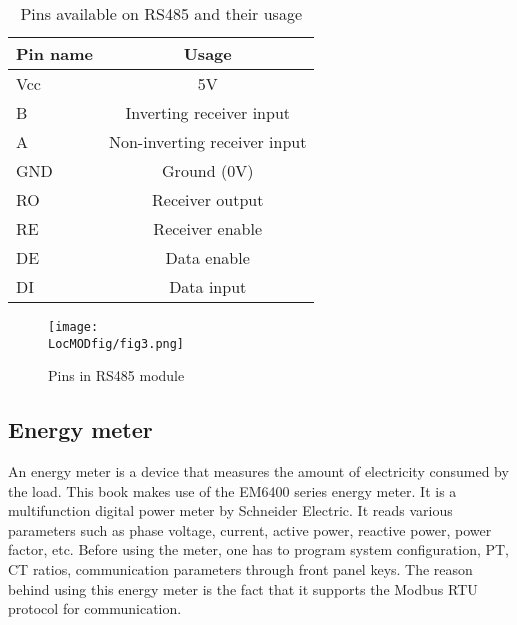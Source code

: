 \begin{table}
  \centering
  \caption{Pins available on RS485 and their usage}
  \label{tab:rs-485-pins}
  \begin{tabular}{lc}\hline
    Pin name & Usage                        \\ \hline 
    Vcc      & 5V                           \\ 
    B        & Inverting receiver input     \\ 
    A        & Non-inverting receiver input \\
    GND      & Ground (0V)                  \\ 
    RO       & Receiver output              \\ 
    RE       & Receiver enable              \\
    DE       & Data enable                  \\
    DI       & Data input                   \\ 
    \hline
  \end{tabular}
\end{table}





\begin{figure}
  \centering
  \texttt{[image: \\LocMODfig/fig3.png]}
  \caption{Pins in RS485 module}
  \label{rs-485}
\end{figure}

\subsection{Energy meter}
\label{sec:energy-meter}
An energy meter is a device that measures the amount of electricity consumed
by the load. This book makes use of the EM6400 series energy meter. It is a
multifunction digital power meter by Schneider Electric. It
reads various parameters such as phase voltage, current, active power,
reactive power, power factor, etc. Before using the meter, one has to
program system configuration, PT, CT ratios, communication parameters
through front panel keys. The reason behind using this energy meter is 
the fact that it supports the Modbus RTU protocol for communication.

